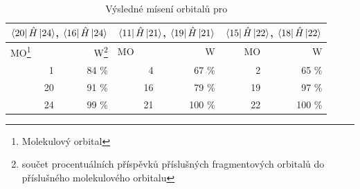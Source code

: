 \documentclass[
  printed, %
  table,   %
  lof,     %
  lot,     %
  oneside,
]{fithesis3}
\begin{document}
\begin{figure}
\begin{center}
\label{obr_h4sio4_vysledky_I}
\end{center}
\end{figure}
 
 
 
\begin{table}[htbp]
\begin{minipage}{\textwidth}
\caption{Výsledné mísení orbitalů pro }
\begin{center}
\begin{tabular}{|r|r|r|r|r|r|}
\hline 
\multicolumn{2}{|c|}{$\bra{20}{\hat{H}}\ket{24}$, $\bra{16}{\hat{H}}\ket{24}$} & \multicolumn{2}{|c|}{$\bra{11}{\hat{H}}\ket{21}$, $\bra{19}{\hat{H}}\ket{21}$}& \multicolumn{2}{|c|}{$\bra{15}{\hat{H}}\ket{22}$, $\bra{18}{\hat{H}}\ket{22}$} \\
\hline \hline
\multicolumn{1}{|l|}{MO\footnote{Molekulový orbital} } & \multicolumn{1}{r|}{W\footnote{součet procentuálních příspěvků příslušných fragmentových orbitalů do příslušného molekulového orbitalu}} & \multicolumn{1}{l|}{MO} & \multicolumn{1}{r|}{W} & MO & \multicolumn{1}{r|}{W} \\ \hline
1 & 84 \% & 4 & 67 \% & 2 & 65 \% \\ \hline
20 & 91 \% & 16 & 79 \% & 19 &  97 \% \\ \hline
24 & 99 \% & 21 & 100 \% &  22& 100 \% \\ \hline
\end{tabular}
\end{center}
\label{tab_h4sio4_vysledky}
\end{minipage}
\end{table}
    
\end{document}
